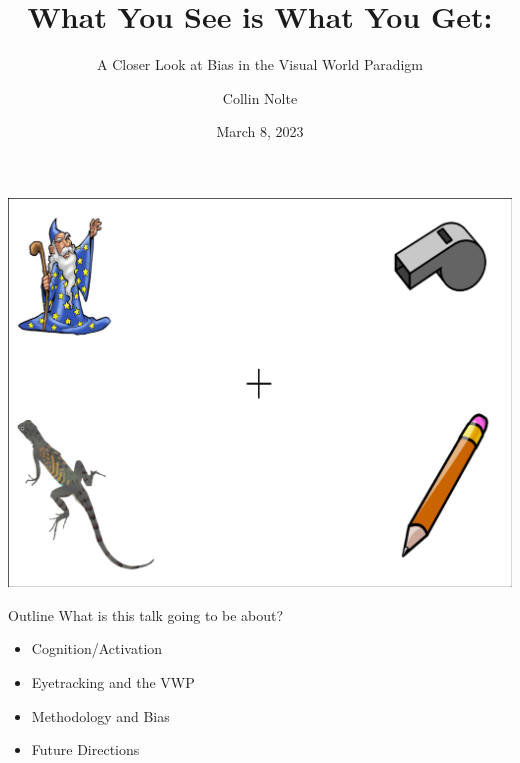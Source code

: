 \documentclass{beamer}
\title[Public Defense]{What You See is What You Get:}
\subtitle{A Closer Look at Bias in the Visual World Paradigm}
\author{Collin Nolte}
\date{March 8, 2023}
\begin{document}
\begin{frame}
  \titlepage
\end{frame}


\begin{frame}
\begin{center}
\includegraphics[scale=0.35]{img/wizard_lizard_whistle_pencil.png}
\end{center}
\end{frame}

%

\begin{frame}{Outline}\Large
What is this talk going to be about?

\begin{itemize}
	\item Cognition/Activation 
	\item Eyetracking and the VWP
	\item Methodology and Bias
	\item Future Directions
\end{itemize}

\end{frame}
\end{document}
